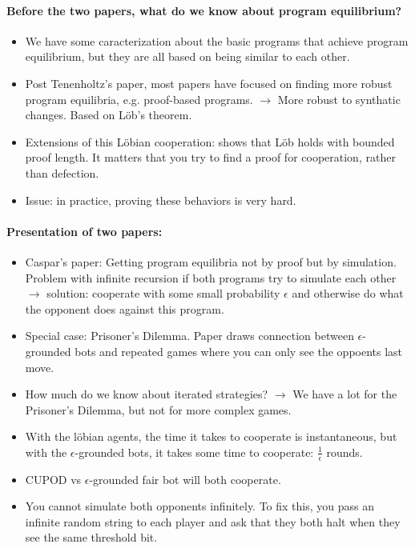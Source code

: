 \documentclass{article}
\begin{document}
\paragraph{Before the two papers, what do we know about program equilibrium?}
\begin{itemize}
    \item We have some caracterization about the basic programs that achieve program equilibrium, but they are all based on being similar to each other.
    \item Post Tenenholtz's paper, most papers have focused on finding more robust program equilibria, e.g. proof-based programs. $\to$ More robust to synthatic changes. Based on Löb's theorem.
    \item Extensions of this Löbian cooperation: \cite{critch2022cooperativeuncooperativeinstitutiondesigns} shows that Löb holds with bounded proof length. It matters that you try to find a proof for cooperation, rather than defection. 
    \item Issue: in practice, proving these behaviors is very hard.
\end{itemize}

\paragraph{Presentation of two papers: \cite{barasz2021robustcooperationprisonersdilemma,cooper2025characterisingsimulationbasedprogramequilibria}}
\begin{itemize}
    \item Caspar's paper: Getting program equilibria not by proof but by simulation. Problem with infinite recursion if both programs try to simulate each other $\to$ solution: cooperate with some small probability $\epsilon$ and otherwise do what the opponent does against this program.
    \item Special case: Prisoner's Dilemma. Paper draws connection between $\epsilon$-grounded bots and repeated games where you can only see the oppoents last move.
    \item How much do we know about iterated strategies? $\to$ We have a lot for the Prisoner's Dilemma, but not for more complex games.
    \item With the löbian agents, the time it takes to cooperate is instantaneous, but with the $\epsilon$-grounded bots, it takes some time to cooperate: $\frac{1}{\epsilon}$ rounds.
    \item CUPOD vs $\epsilon$-grounded fair bot will both cooperate.
    \item You cannot simulate both opponents infinitely. To fix this, you pass an infinite random string to each player and ask that they both halt when they see the same threshold bit.
\end{itemize}
\end{document}
